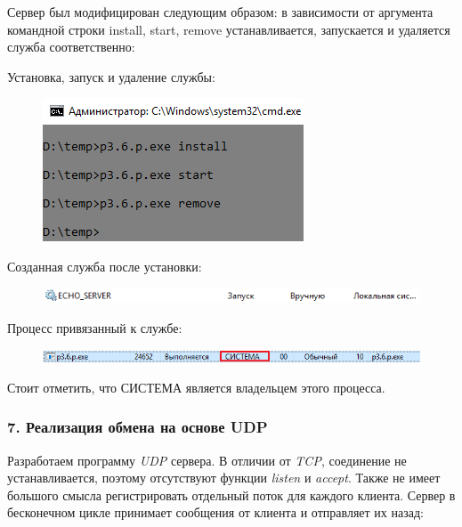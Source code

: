 \documentclass[14pt,a4paper,report]{report}
\begin{document}
Сервер был модифицирован следующим образом: в зависимости от аргумента командной строки install, start, remove устанавливается, запускается и удаляется служба соответственно:



\clearpage

Установка, запуск и удаление службы:

\begin{figure}[h!]
	\centering
	\includegraphics[scale = 0.8]{images/p3_6_api.png}
	
	\caption{}
	\label{image:20}
\end{figure}

Созданная служба после установки:

\begin{figure}[h!]
	\centering
	\includegraphics[scale = 1.0]{images/p3_6_service.png}
	
	\caption{}
	\label{image:21}
\end{figure}

Процесс привязанный к службе:

\begin{figure}[h!]
	\centering
	\includegraphics[scale = 0.9]{images/p3_6_process.png}
	
	\caption{}
	\label{image:22}
\end{figure}

Стоит отметить, что СИСТЕМА является владельцем этого процесса.

\subsubsection{7. Реализация обмена на основе UDP}

Разработаем программу \emph{UDP} сервера. В отличии от \emph{TCP}, соединение не устанавливается, поэтому отсутствуют функции \emph{listen} и \emph{accept}. Также не имеет большого смысла регистрировать отдельный поток для каждого клиента. Сервер в бесконечном цикле принимает сообщения от клиента и отправляет их назад:
\end{document}
